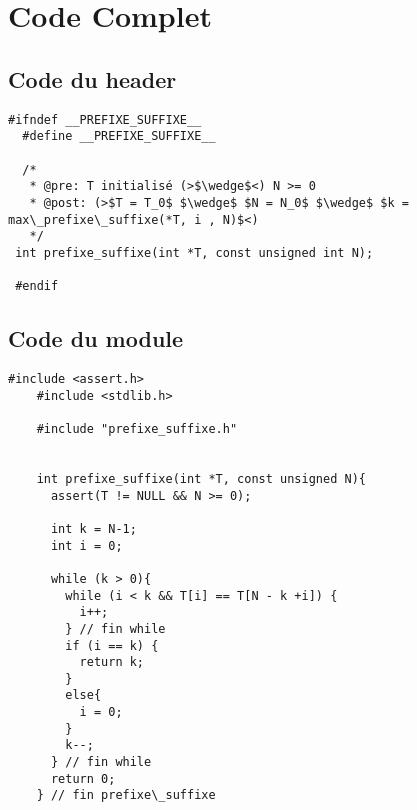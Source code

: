\section{Code Complet}\label{code}
\subsection{Code du header}
\begin{lstlisting}[caption={prefixe\_suffixe.h}]
  #ifndef __PREFIXE_SUFFIXE__
  #define __PREFIXE_SUFFIXE__
 
  /*
   * @pre: T initialisé (>$\wedge$<) N >= 0
   * @post: (>$T = T_0$ $\wedge$ $N = N_0$ $\wedge$ $k = max\_prefixe\_suffixe(*T, i , N)$<)
   */
 int prefixe_suffixe(int *T, const unsigned int N);
 
 #endif
\end{lstlisting}

\subsection{Code du module}
\begin{lstlisting}[caption={prefixe\_suffixe.c}]
    #include <assert.h>
    #include <stdlib.h>
    
    #include "prefixe_suffixe.h"
    
    
    int prefixe_suffixe(int *T, const unsigned N){
      assert(T != NULL && N >= 0);

      int k = N-1;
      int i = 0;
    
      while (k > 0){
        while (i < k && T[i] == T[N - k +i]) {
          i++;
        } // fin while
        if (i == k) {
          return k;
        }
        else{
          i = 0;
        }
        k--;
      } // fin while
      return 0;
    } // fin prefixe\_suffixe
\end{lstlisting}


